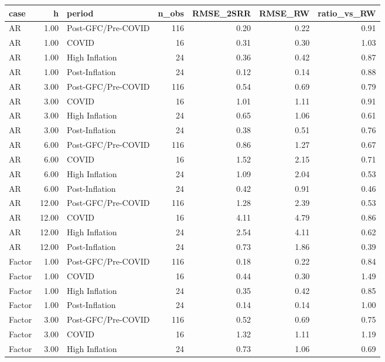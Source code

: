\begin{table}[ht]
\centering
\begin{tabular}{lrlrrrr}
  \hline
case & h & period & n\_obs & RMSE\_2SRR & RMSE\_RW & ratio\_vs\_RW \\ 
  \hline
AR & 1.00 & Post-GFC/Pre-COVID & 116 & 0.20 & 0.22 & 0.91 \\ 
  AR & 1.00 & COVID &  16 & 0.31 & 0.30 & 1.03 \\ 
  AR & 1.00 & High Inflation &  24 & 0.36 & 0.42 & 0.87 \\ 
  AR & 1.00 & Post-Inflation &  24 & 0.12 & 0.14 & 0.88 \\ 
  AR & 3.00 & Post-GFC/Pre-COVID & 116 & 0.54 & 0.69 & 0.79 \\ 
  AR & 3.00 & COVID &  16 & 1.01 & 1.11 & 0.91 \\ 
  AR & 3.00 & High Inflation &  24 & 0.65 & 1.06 & 0.61 \\ 
  AR & 3.00 & Post-Inflation &  24 & 0.38 & 0.51 & 0.76 \\ 
  AR & 6.00 & Post-GFC/Pre-COVID & 116 & 0.86 & 1.27 & 0.67 \\ 
  AR & 6.00 & COVID &  16 & 1.52 & 2.15 & 0.71 \\ 
  AR & 6.00 & High Inflation &  24 & 1.09 & 2.04 & 0.53 \\ 
  AR & 6.00 & Post-Inflation &  24 & 0.42 & 0.91 & 0.46 \\ 
  AR & 12.00 & Post-GFC/Pre-COVID & 116 & 1.28 & 2.39 & 0.53 \\ 
  AR & 12.00 & COVID &  16 & 4.11 & 4.79 & 0.86 \\ 
  AR & 12.00 & High Inflation &  24 & 2.54 & 4.11 & 0.62 \\ 
  AR & 12.00 & Post-Inflation &  24 & 0.73 & 1.86 & 0.39 \\ 
  Factor & 1.00 & Post-GFC/Pre-COVID & 116 & 0.18 & 0.22 & 0.84 \\ 
  Factor & 1.00 & COVID &  16 & 0.44 & 0.30 & 1.49 \\ 
  Factor & 1.00 & High Inflation &  24 & 0.35 & 0.42 & 0.85 \\ 
  Factor & 1.00 & Post-Inflation &  24 & 0.14 & 0.14 & 1.00 \\ 
  Factor & 3.00 & Post-GFC/Pre-COVID & 116 & 0.52 & 0.69 & 0.75 \\ 
  Factor & 3.00 & COVID &  16 & 1.32 & 1.11 & 1.19 \\ 
  Factor & 3.00 & High Inflation &  24 & 0.73 & 1.06 & 0.69 \\ 

\end{tabular}
\end{table}
